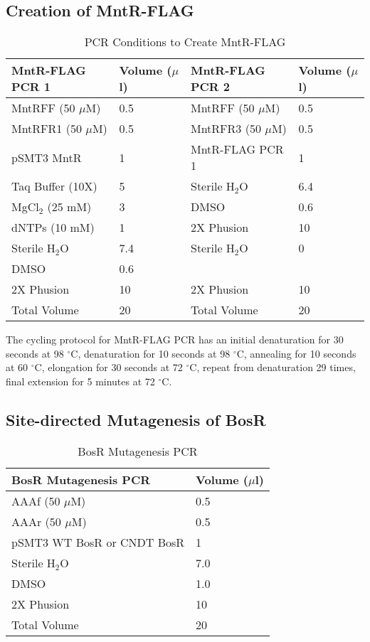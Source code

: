 \documentclass[12pt,twoside]{reedthesis}
\begin{document}
 \subsection{Creation of MntR-FLAG}





\begin{table}[H]
	\caption{PCR Conditions to Create MntR-FLAG} 
	\label{MntRFLAGPCR}
	\begin{tabular}{|l | l| |l| l|}
		\hline
		MntR-FLAG PCR 1 & Volume ($\mu$l) & MntR-FLAG PCR 2  & Volume ($\mu$l) \\
		\hline 
		MntRFF (50 $\mu$M) & 0.5 & MntRFF (50 $\mu$M) & 0.5   \\ 
		MntRFR1 (50 $\mu$M) & 0.5 & MntRFR3 (50 $\mu$M) & 0.5 \\  			
		pSMT3 MntR & 1  & MntR-FLAG PCR 1 &  1  \\
		Taq Buffer (10X) & 5 & Sterile H$_{2}$O & 6.4 \\ 
		MgCl$_{2}$ (25 mM) & 3 & DMSO & 0.6 \\  
		dNTPs (10 mM) & 1 & 2X Phusion & 10 \\     
		Sterile H$_{2}$O & 7.4  & Sterile H$_{2}$O & 0  \\
		DMSO & 0.6 &  &  \\
		2X Phusion & 10 & 2X Phusion & 10 \\
		\hline   
		Total Volume & 20 & Total Volume & 20  \\
		\hline
	\end{tabular}
\end{table}

The cycling protocol for MntR-FLAG PCR has an initial denaturation for 30 seconds at 98 $^{\circ}$C, denaturation for 10 seconds at 98 $^{\circ}$C, annealing for 10 seconds at 60 $^{\circ}$C, elongation for 30 seconds at 72 $^{\circ}$C, repeat from denaturation 29 times, final extension for 5 minutes at 72 $^{\circ}$C. 


 \subsection{Site-directed Mutagenesis of BosR}
 
 
\begin{table}[H]
	\caption{BosR Mutagenesis PCR} 
	\label{BosRmutpcr}
	\begin{tabular}{|l| | l|}
		\hline
		BosR Mutagenesis PCR & Volume ($\mu$l)  \\
		\hline 
		AAAf (50 $\mu$M) & 0.5   \\ 
		AAAr (50 $\mu$M) & 0.5 \\  			
		pSMT3 WT BosR or CNDT BosR & 1   \\
		Sterile H$_{2}$O & 7.0   \\ 
		DMSO & 1.0 \\  
		2X Phusion & 10  \\     
		\hline   
		Total Volume & 20  \\
		\hline
	\end{tabular}
\end{table}
\end{document}
